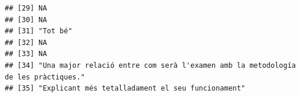 \documentclass[
]{article}
\begin{document}
\begin{verbatim}
## [29] NA                                                                                                                                                                                                                                                                                                                                                                                                   
## [30] NA                                                                                                                                                                                                                                                                                                                                                                                                   
## [31] "Tot bé"                                                                                                                                                                                                                                                                                                                                                                                             
## [32] NA                                                                                                                                                                                                                                                                                                                                                                                                   
## [33] NA                                                                                                                                                                                                                                                                                                                                                                                                   
## [34] "Una major relació entre com serà l'examen amb la metodología de les pràctiques."                                                                                                                                                                                                                                                                                                                    
## [35] "Explicant més tetalladament el seu funcionament"                                                                                                                                                                                                                                                                                                                                                    

\end{verbatim}
\end{document}
